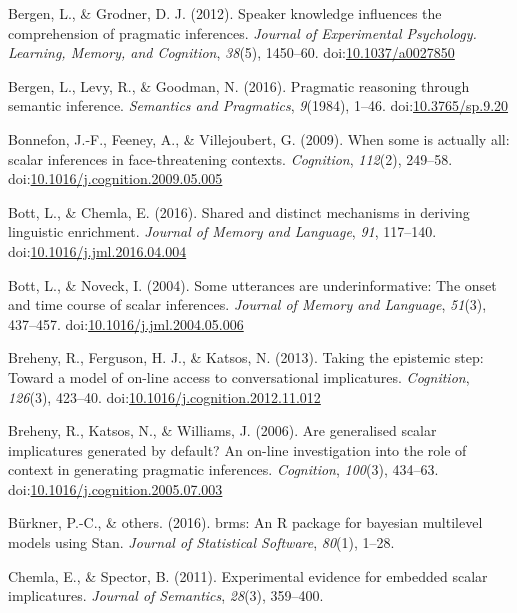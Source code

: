 \documentclass[man]{apa6}
\theoremstyle{definition}
\theoremstyle{definition}
\theoremstyle{definition}
\theoremstyle{remark}
\begin{document}
\hypertarget{ref-Bergen2012}{}
Bergen, L., \& Grodner, D. J. (2012). Speaker knowledge influences the
comprehension of pragmatic inferences. \emph{Journal of Experimental
Psychology. Learning, Memory, and Cognition}, \emph{38}(5), 1450--60.
doi:\href{https://doi.org/10.1037/a0027850}{10.1037/a0027850}

\hypertarget{ref-Bergen2016}{}
Bergen, L., Levy, R., \& Goodman, N. (2016). Pragmatic reasoning through
semantic inference. \emph{Semantics and Pragmatics}, \emph{9}(1984),
1--46. doi:\href{https://doi.org/10.3765/sp.9.20}{10.3765/sp.9.20}

\hypertarget{ref-Bonnefon2009}{}
Bonnefon, J.-F., Feeney, A., \& Villejoubert, G. (2009). When some is
actually all: scalar inferences in face-threatening contexts.
\emph{Cognition}, \emph{112}(2), 249--58.
doi:\href{https://doi.org/10.1016/j.cognition.2009.05.005}{10.1016/j.cognition.2009.05.005}

\hypertarget{ref-Bott2016}{}
Bott, L., \& Chemla, E. (2016). Shared and distinct mechanisms in
deriving linguistic enrichment. \emph{Journal of Memory and Language},
\emph{91}, 117--140.
doi:\href{https://doi.org/10.1016/j.jml.2016.04.004}{10.1016/j.jml.2016.04.004}

\hypertarget{ref-Bott2004}{}
Bott, L., \& Noveck, I. (2004). Some utterances are underinformative:
The onset and time course of scalar inferences. \emph{Journal of Memory
and Language}, \emph{51}(3), 437--457.
doi:\href{https://doi.org/10.1016/j.jml.2004.05.006}{10.1016/j.jml.2004.05.006}

\hypertarget{ref-Breheny2013}{}
Breheny, R., Ferguson, H. J., \& Katsos, N. (2013). Taking the epistemic
step: Toward a model of on-line access to conversational implicatures.
\emph{Cognition}, \emph{126}(3), 423--40.
doi:\href{https://doi.org/10.1016/j.cognition.2012.11.012}{10.1016/j.cognition.2012.11.012}

\hypertarget{ref-Breheny2006}{}
Breheny, R., Katsos, N., \& Williams, J. (2006). Are generalised scalar
implicatures generated by default? An on-line investigation into the
role of context in generating pragmatic inferences. \emph{Cognition},
\emph{100}(3), 434--63.
doi:\href{https://doi.org/10.1016/j.cognition.2005.07.003}{10.1016/j.cognition.2005.07.003}

\hypertarget{ref-burkner2016brms}{}
Bürkner, P.-C., \& others. (2016). brms: An R package for bayesian
multilevel models using Stan. \emph{Journal of Statistical Software},
\emph{80}(1), 1--28.

\hypertarget{ref-Chemla2011}{}
Chemla, E., \& Spector, B. (2011). Experimental evidence for embedded
scalar implicatures. \emph{Journal of Semantics}, \emph{28}(3),
359--400.
\end{document}

